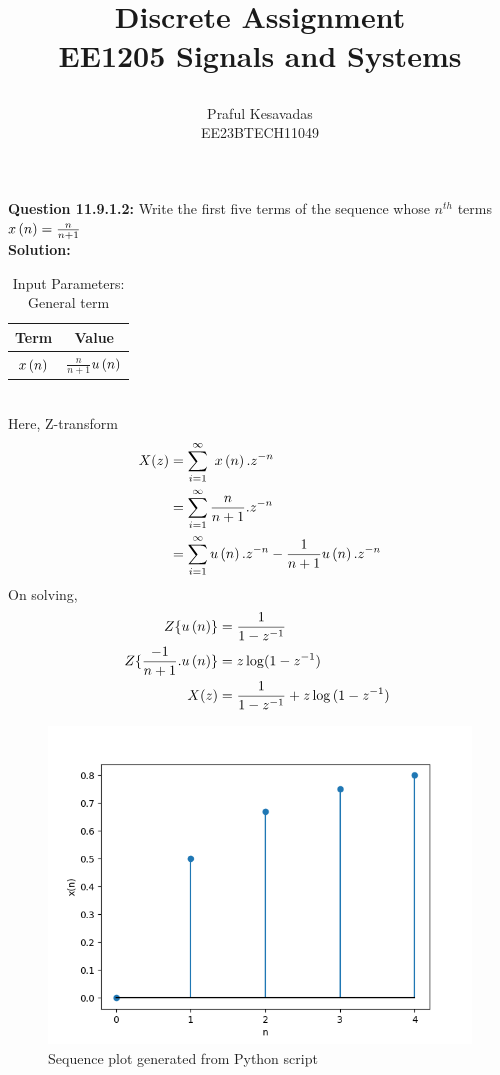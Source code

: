 \documentclass{article}
\begin{document}
\title{
\Huge\textbf{Discrete Assignment}\\
\Huge\textbf{EE1205} Signals and Systems\\
\date{}
}
\large\author{Praful Kesavadas\\EE23BTECH11049}
\maketitle

\textbf{Question 11.9.1.2:}
Write the first five terms of the sequence whose $n^{th}$ terms  $x\left(n\right) = \frac{n}{n+1}$\\
\textbf{Solution:}
\begin{table}[ht]
  \centering
  \begin{tabular}{|c|c|}
    \hline
    \textbf{Term} & \textbf{Value} \\
    \hline
    $x\left(n\right)$ & $\frac{n}{n+1}$$u\left(n\right)$ \\
    \hline
  \end{tabular}
  \caption{Input Parameters: General term}
\end{table}\\
Here, Z-transform
\begin{align}
X(z) &= \sum_{i=1}^\infty\ x\left(n\right).z^{-n}\\
&= \sum_{i=1}^\infty \frac{n}{n+1} . z^{-n}\\
&= \sum_{i=1}^\infty u\left(n\right).z^{-n} - \frac{1}{n+1} u\left(n\right).z^{-n}
\end{align}
On solving, 
\begin{align}
Z\{u\left(n\right)\} &= \frac{1}{1-z^{-1}}\\
Z\{\frac{-1}{n+1}.u\left(n\right)\} &= z\log(1-z^{-1})\\
X(z) &= \frac{1}{1-z^{-1}} + z\log{(1-z^{-1})}\
\end{align}
\begin{figure}[h]
    \centering
    \includegraphics[width=\columnwidth]{figs/graph1.png}
    \caption{Sequence plot generated from Python script}
    \label{fig:sequence-plot}
\end{figure}
\end{document}

